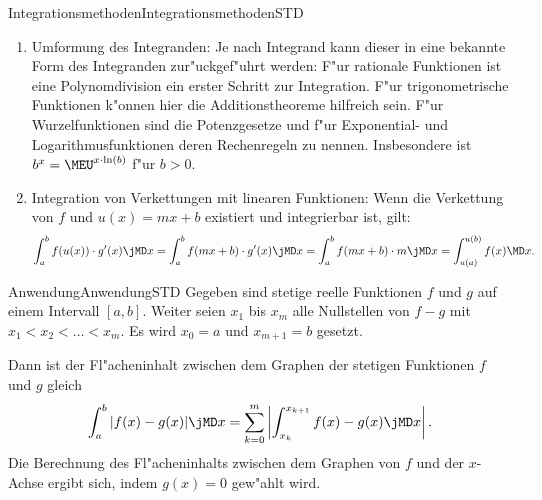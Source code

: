 \begin{MXContent}{Integrationsmethoden}{Integrationsmethoden}{STD}

\begin{enumerate}

\item Umformung des Integranden:
%
Je nach Integrand kann dieser in eine bekannte Form des Integranden 
zur"uckgef"uhrt werden: F"ur rationale Funktionen ist eine Polynomdivision
ein erster Schritt zur Integration. F"ur trigonometrische Funktionen k"onnen 
hier die Additionstheoreme hilfreich sein. F"ur Wurzelfunktionen sind die 
Potenzgesetze und f"ur Exponential- und Logarithmusfunktionen deren
Rechenregeln zu nennen. Insbesondere ist $b^x = \MEU^{x \cdot \ln(b)}$ 
f"ur $b > 0$.

\item Integration von Verkettungen mit linearen Funktionen:
Wenn die Verkettung von $f$ und $u(x) = m x + b$ existiert und 
integrierbar ist, gilt:
\[
\int_{a}^{b} f(u(x)) \cdot g'(x) \jMD x %
= \int_{a}^{b} f(m x + b) \cdot g'(x) \jMD x %
= \int_{a}^{b} f(m x + b) \cdot m \jMD x %
= \int_{u(a)}^{u(b)} f(x) \MD x. %
\]
\end{enumerate}
\end{MXContent}


\begin{MXContent}{Anwendung}{Anwendung}{STD}
Gegeben sind stetige reelle Funktionen $f$ und $g$ auf einem Intervall $[a, b]$. 
Weiter seien $x_1$ bis $x_m$ alle Nullstellen von $f - g$ mit 
$x_1 < x_2 < \ldots < x_m$. 
Es wird $x_0 = a$ und $x_{m+1} = b$ gesetzt.

Dann ist der Fl"acheninhalt zwischen dem Graphen der stetigen Funktionen $f$ 
und $g$ gleich
\[
\int_{a}^b |f(x) - g(x)| \jMD x %
= \sum_{k=0}^{m} \left|\int_{x_k}^{x_{k+1}} f(x) - g(x) \jMD x\right|. %
\]
Die Berechnung des Fl"acheninhalts zwischen dem Graphen von $f$ und der 
$x$-Achse ergibt sich, indem $g(x) = 0$ gew"ahlt wird.
\end{MXContent}


